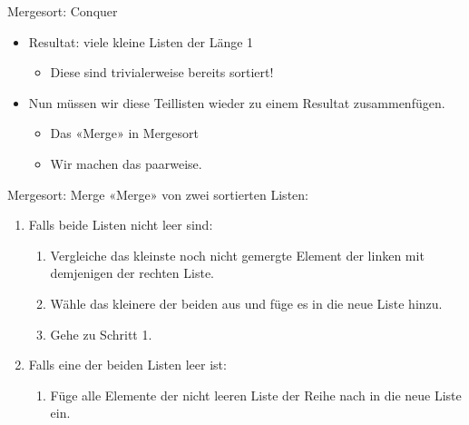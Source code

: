 \begin{frame}[text=large]{Mergesort: Conquer}
  \begin{itemize}
    \item Resultat: viele kleine Listen der Länge 1
    \begin{itemize}
      \item Diese sind trivialerweise bereits sortiert!
    \end{itemize}
    \item Nun müssen wir diese Teillisten wieder zu einem Resultat zusammenfügen.
    \begin{itemize}
      \item Das «Merge» in Mergesort
      \item Wir machen das paarweise.
    \end{itemize}
  \end{itemize}
\end{frame}

\begin{frame}{Mergesort: Merge}
  «Merge» von zwei sortierten Listen:
  \begin{enumerate}
    \item Falls beide Listen nicht leer sind:
    \begin{enumerate}
      \item Vergleiche das kleinste noch nicht gemergte Element der linken mit demjenigen der rechten Liste.
      \item Wähle das kleinere der beiden aus und füge es in die neue Liste hinzu.
      \item Gehe zu Schritt 1.
    \end{enumerate}
    \item Falls eine der beiden Listen leer ist:
    \begin{enumerate}
      \item Füge alle Elemente der nicht leeren Liste der Reihe nach in die neue Liste ein.
    \end{enumerate}
  \end{enumerate}
\end{frame}

